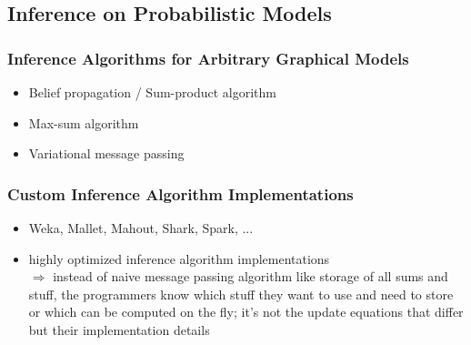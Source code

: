 \subsection{Inference on Probabilistic Models}

\subsubsection{Inference Algorithms for Arbitrary Graphical Models}

\begin{itemize}
\item Belief propagation / Sum-product algorithm
\item Max-sum algorithm
\item Variational message passing
\end{itemize}

\subsubsection{Custom Inference Algorithm Implementations}
\label{subsec:custom-inference}

\begin{itemize}
\item Weka, Mallet, Mahout, Shark, Spark, ...
\item highly optimized inference algorithm implementations\\
$\Rightarrow$ instead of naive message passing algorithm like storage of all sums and stuff, the programmers know which stuff they want to use and need to store or which can be computed on the fly; it's not the update equations that differ but their implementation details
\end{itemize}

